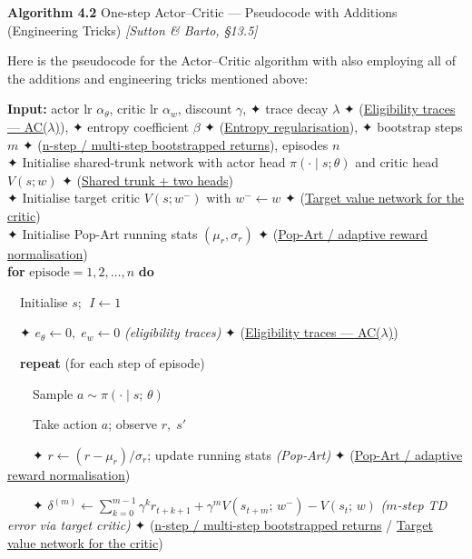 \documentclass[11pt]{article}
\begin{document}
    \begin{pseudobox}

\textbf{Algorithm 4.2} One-step Actor--Critic --- Pseudocode with
Additions (Engineering Tricks) \emph{{[}Sutton \& Barto, §13.5{]}}

\tcbline

Here is the pseudocode for the Actor--Critic algorithm with also
employing all of the additions and engineering tricks mentioned above:

\textbf{Input:} actor lr \(\alpha_\theta\), critic lr \(\alpha_w\),
discount \(\gamma\), ✦ trace decay \(\lambda\) ✦
(\hyperref[trick-4-2-5]{Eligibility traces --- AC(\(\lambda\))}), ✦
entropy coefficient \(\beta\) ✦ (\hyperref[trick-4-2-4]{Entropy
regularisation}), ✦ bootstrap steps \(m\) ✦
(\hyperref[trick-4-2-3]{n-step / multi-step bootstrapped returns}),
episodes \(n\)\\
✦ Initialise shared-trunk network with actor head
\(\pi(\cdot\mid s;\theta)\) and critic head \(V(s;w)\) ✦
(\hyperref[trick-4-2-1]{Shared trunk + two heads})\\
✦ Initialise target critic \(V(s;w^-)\) with \(w^- \leftarrow w\) ✦
(\hyperref[trick-4-2-2]{Target value network for the critic})\\
✦ Initialise Pop-Art running stats \((\mu_r,\sigma_r)\) ✦
(\hyperref[trick-4-2-6]{Pop-Art / adaptive reward normalisation})\\
\textbf{for} \(\text{episode} = 1, 2, \ldots, n\) \textbf{do}\\
\strut ~~Initialise \(s\); \(\;I \leftarrow 1\)\\
\strut ~~✦ \(e_\theta \leftarrow 0,\;e_w \leftarrow 0\)
\emph{(eligibility traces)} ✦ (\hyperref[trick-4-2-5]{Eligibility traces
--- AC(\(\lambda\))})\\
\strut ~~\textbf{repeat} (for each step of episode)\\
\strut ~~~~Sample \(a \sim \pi(\cdot \mid s;\, \theta)\)\\
\strut ~~~~Take action \(a\); observe \(r,\; s'\)\\
\strut ~~~~✦ \(r \leftarrow (r - \mu_r)/\sigma_r\); update running stats
\emph{(Pop-Art)} ✦ (\hyperref[trick-4-2-6]{Pop-Art / adaptive reward
normalisation})\\
\strut ~~~~✦
\(\delta^{(m)} \leftarrow \sum_{k=0}^{m-1}\gamma^k r_{t+k+1} + \gamma^m V(s_{t+m};\, w^-) - V(s_t;\, w)\)
\emph{(\(m\)-step TD error via target critic)} ✦
(\hyperref[trick-4-2-3]{n-step / multi-step bootstrapped returns} /
\hyperref[trick-4-2-2]{Target value network for the critic})\\

\end{pseudobox}
\end{document}

